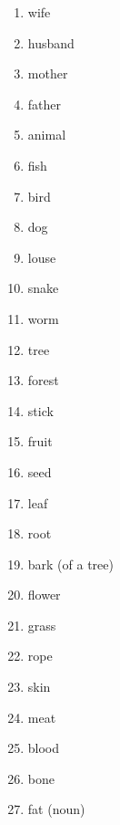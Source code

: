 \documentclass[a5,landscape]{article}
\begin{document}
{\begin{multicols}{4}
\begin{enumerate}
\item   wife 

\item   husband 

\item   mother 

\item   father 

\item   animal 

\item   fish 

\item   bird 

\item   dog 

\item   louse 

\item   snake 

\item   worm 

\item   tree 

\item   forest 

\item   stick 

\item   fruit 

\item   seed 

\item   leaf 

\item   root 

\item   bark (of a tree) 

\item   flower 

\item   grass 

\item   rope 

\item   skin 

\item   meat 

\item   blood 

\item   bone 

\item   fat (noun) 


\end{enumerate}
\end{multicols}}
\end{document}
